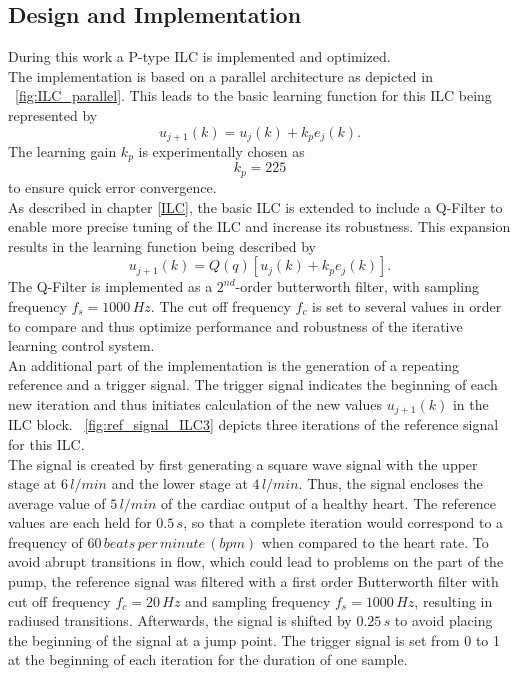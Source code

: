 \subsection{Design and Implementation}
During this work a P-type ILC is implemented and optimized.
\\The implementation is based on a parallel architecture as depicted in \figurename~\ref{fig:ILC_parallel}. This leads to the basic learning function for this ILC being represented by
\begin{equation}
  u_{j+1}(k) = u_{j}(k)+k_{p}e_{j}(k).
\end{equation}
The learning gain $k_p$ is experimentally chosen as
\begin{equation}
  k_p = 225
\end{equation}
to ensure quick error convergence.
\\As described in chapter \ref{ILC}, the basic ILC is extended to include a Q-Filter to enable more precise tuning of the ILC and increase its robustness.
This expansion results in the learning function being described by
\begin{equation}
  u_{j+1}(k) = Q(q)[u_{j}(k)+k_{p}e_{j}(k)].
\end{equation}
The Q-Filter is implemented as a $2^{nd}$-order butterworth filter, with sampling frequency $f_s=1000\,Hz$. The cut off frequency $f_c$ is set to several values in order to compare and thus optimize performance and robustness of the iterative learning control system.
\\An additional part of the implementation is the generation of a repeating reference and a trigger signal. The trigger signal indicates the beginning of each new iteration and thus initiates calculation of the new values $u_{j+1}(k)$ in the ILC block.
\figurename~\ref{fig:ref_signal_ILC3} depicts three iterations of the reference signal for this ILC.
\\The signal is created by first generating a square wave signal with the upper stage at $6\, l/min$ and the lower stage at $4\, l/min$. Thus, the signal encloses the average value of $5\, l/min$ of the cardiac output of a healthy heart. The reference values are each held for $0.5\, s$, so that a complete iteration would correspond to a frequency of $60\, beats\, per\, minute\, (bpm)$ when compared to the heart rate. To avoid abrupt transitions in flow, which could lead to problems on the part of the pump, the reference signal was filtered with a first order Butterworth filter with cut off frequency $f_c=20\,Hz$ and sampling frequency $f_s=1000\,Hz$, resulting in radiused transitions. Afterwards, the signal is shifted by $0.25\, s$ to avoid placing the beginning of the signal at a jump point. The trigger signal is set from 0 to 1 at the beginning of each iteration for the duration of one sample.
